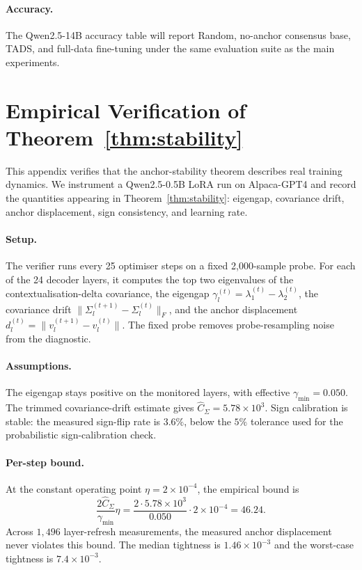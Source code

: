 \paragraph{Accuracy.}
The Qwen2.5-14B accuracy table will report Random, no-anchor
consensus base, \textsc{TADS}, and full-data fine-tuning under the
same evaluation suite as the main experiments.

\section{Empirical Verification of Theorem~\ref{thm:stability}}
\label{app:thm-verification}

This appendix verifies that the anchor-stability theorem describes
real training dynamics. We instrument a Qwen2.5-0.5B LoRA run on
Alpaca-GPT4 and record the quantities appearing in
Theorem~\ref{thm:stability}: eigengap, covariance drift, anchor
displacement, sign consistency, and learning rate.

\paragraph{Setup.}
The verifier runs every 25 optimiser steps on a fixed
2{,}000-sample probe. For each of the 24 decoder layers, it computes
the top two eigenvalues of the contextualisation-delta covariance,
the eigengap
$\gamma_l^{(t)}=\lambda_1^{(t)}-\lambda_2^{(t)}$, the covariance
drift $\|\Sigma_l^{(t+1)}-\Sigma_l^{(t)}\|_F$, and the anchor
displacement
$d_l^{(t)}=\|v_l^{(t+1)}-v_l^{(t)}\|$. The fixed probe removes
probe-resampling noise from the diagnostic.

\paragraph{Assumptions.}
The eigengap stays positive on the monitored layers, with effective
$\gamma_{\min}=0.050$. The trimmed covariance-drift estimate gives
$\hat C_\Sigma=5.78\times10^3$. Sign calibration is stable: the
measured sign-flip rate is $3.6\%$, below the $5\%$ tolerance used
for the probabilistic sign-calibration check.

\paragraph{Per-step bound.}
At the constant operating point $\eta=2\times10^{-4}$, the empirical
bound is
\[
\frac{2\hat C_\Sigma}{\gamma_{\min}}\eta
=
\frac{2\cdot 5.78\times10^3}{0.050}\cdot 2\times10^{-4}
=
46.24 .
\]
Across $1{,}496$ layer-refresh measurements, the measured anchor
displacement never violates this bound. The median tightness is
$1.46\times10^{-3}$ and the worst-case tightness is
$7.4\times10^{-3}$.


